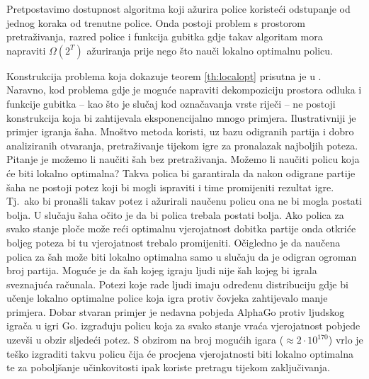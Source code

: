\begin{theorem} \label{th:localopt}

  Pretpostavimo dostupnost algoritma koji ažurira police koristeći odstupanje od
  jednog koraka od trenutne police. Onda postoji problem s prostorom
  pretraživanja, razred police i funkcija gubitka gdje takav algoritam mora
  napraviti $\Omega(2^T)$ ažuriranja prije nego što nauči lokalno optimalnu
  policu.

\end{theorem}

Konstrukcija problema koja dokazuje teorem \ref{th:localopt} prisutna je u
\citep{daume15lols}. Naravno, kod problema gdje je moguće napraviti
dekompoziciju prostora odluka i funkcije gubitka -- kao što je slučaj kod
označavanja vrste riječi -- ne postoji konstrukcija koja bi zahtijevala
eksponencijalno mnogo primjera. Ilustrativniji je primjer igranja šaha. Mnoštvo
metoda koristi, uz bazu odigranih partija i dobro analiziranih otvaranja,
pretraživanje tijekom igre za pronalazak najboljih poteza. Pitanje je možemo li
naučiti šah bez pretraživanja. Možemo li naučiti policu koja će biti lokalno
optimalna? Takva polica bi garantirala da nakon odigrane partije šaha ne postoji
potez koji bi mogli ispraviti i time promijeniti rezultat igre. Tj.~ako bi
pronašli takav potez i ažurirali naučenu policu ona ne bi mogla postati bolja. U
slučaju šaha očito je da bi polica trebala postati bolja. Ako polica za svako
stanje ploče može reći optimalnu vjerojatnost dobitka partije onda otkriće
boljeg poteza bi tu vjerojatnost trebalo promijeniti. Očigledno je da naučena
polica za šah može biti lokalno optimalna samo u slučaju da je odigran ogroman
broj partija. Moguće je da šah kojeg igraju ljudi nije šah kojeg bi igrala
sveznajuća računala. Potezi koje rade ljudi imaju određenu distribuciju gdje bi
učenje lokalno optimalne police koja igra protiv čovjeka zahtijevalo manje
primjera. Dobar stvaran primjer je nedavna pobjeda AlphaGo protiv ljudskog
igrača u igri Go. \citet{silver2016mastering} izgrađuju policu koja za svako
stanje vraća vjerojatnost pobjede uzevši u obzir sljedeći potez. S obzirom na
broj mogućih igara ($\approx 2\cdot10^{170}$) vrlo je teško izgraditi takvu
policu čija će procjena vjerojatnosti biti lokalno optimalna te za poboljšanje
učinkovitosti ipak koriste pretragu tijekom zaključivanja.
